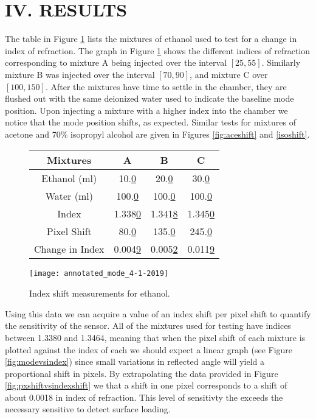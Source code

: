 \section*{IV. RESULTS}
\label{sec:results}
\hspace{0.25in}
The table in Figure \ref{fig:ethshift} lists the mixtures of ethanol used to test for a change in index of refraction. The graph in Figure \ref{fig:ethshift} shows the different indices of refraction corresponding to mixture A being injected over the interval $[25, 55]$. Similarly mixture B was injected over the interval $[70, 90]$, and mixture C over $[100, 150]$. After the mixtures have time to settle in the chamber, they are flushed out with the same deionized water used to indicate the baseline mode position. Upon injecting a mixture with a higher index into the chamber we notice that the mode position shifts, as expected. Similar tests for mixtures of acetone and 70\% isopropyl alcohol are given in Figures \ref{fig:aceshift} and \ref{isoshift}.

\begin{figure}[h]
\begin{center}
\begin{tabular}{| c c c c |}
	\hline
	Mixtures      	 & A     			  & B      			   & C \\
	\hline
	Ethanol (ml)  	 & 10.\underline{0}   & 20.\underline{0}   & 30.\underline{0} \\
	Water   (ml)  	 & 100.\underline{0}  & 100.\underline{0}  & 100.\underline{0} \\
	Index         	 & 1.338\underline{0} & 1.341\underline{8} & 1.345\underline{0} \\
	Pixel Shift  	 & 80.\underline{0}	  & 135.\underline{0}  & 245.\underline{0} \\
	Change in Index  & 0.004\underline{9} & 0.005\underline{2} & 0.011\underline{9} \\   
	\hline
\end{tabular}
	\texttt{[image: annotated\_mode\_4-1-2019]}
	\caption{Index shift measurements for ethanol.}
	\label{fig:ethshift}
\end{center}
\end{figure}

\hspace{0.1in}
Using this data we can acquire a value of an index shift per pixel shift to quantify the sensitivity of the sensor. All of the mixtures used for testing have indices between 1.3380 and 1.3464, meaning that when the pixel shift of each mixture is plotted against the index of each we should expect a linear graph (see Figure \ref{fig:modevsindex}) since small variations in reflected angle will yield a proportional shift in pixels.
By extrapolating the data provided in Figure \ref{fig:pxshiftvsindexshift} we that a shift in one pixel corresponds to a shift of about 0.0018 in index of refraction. This level of sensitivty the exceeds the necessary sensitive to detect surface loading.

